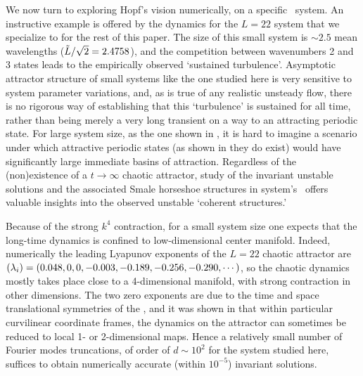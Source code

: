 

We now turn to exploring Hopf's vision
numerically, on a specific \KS\ system.
An instructive example is offered by the dynamics for
the  $L=22$  system
that we specialize to for the rest of this paper.
The size of this
small system is $\sim 2.5$ mean wavelengths
($\tilde{L}/\sqrt{2}= 2.4758$),
and the competition between wavenumbers 2 and 3 states
leads to the empirically observed `sustained turbulence'.
Asymptotic attractor structure of small systems like
the one studied here
is very sensitive to system parameter variations, and,
as is true of
any realistic unsteady flow, there is no rigorous way of
establishing that this `turbulence' is sustained for all time,
rather than being
merely a very long transient on a way to an
attracting periodic state.
For large system size, as the one shown in , it is
hard to imagine a scenario under which attractive periodic states
(as shown in  they do exist) would have significantly
large immediate basins of attraction.
Regardless of the
(non)existence of a $t \to \infty$ chaotic attractor, study
of the invariant unstable solutions and the associated Smale
horseshoe structures in system's \statesp\ offers valuable
insights into the observed unstable `coherent structures.'

Because of the strong $k^4$ contraction, for a small system size
one expects that the long-time dynamics is confined to low-dimensional
center manifold. Indeed, numerically the leading Lyapunov exponents of the
$L=22$ chaotic attractor are
$(\lambda_i) = (0.048, 0, 0, -0.003, -0.189, -0.256, -0.290, \cdots)$,
so the chaotic dynamics mostly takes
place close to a 4-dimensional manifold, with strong
contraction in other dimensions.  The two zero exponents
are due to the
time and space translational symmetries of the \KSe,
and it was shown in 
that within particular curvilinear coordinate frames, the
dynamics on the attractor can sometimes be reduced to
local 1- or 2-dimensional maps.
Hence a relatively small
number of Fourier modes truncations, of order of $d \sim 10^2$
for the system studied here, suffices to obtain
numerically accurate (within $10^{-5}$) invariant
solutions.


